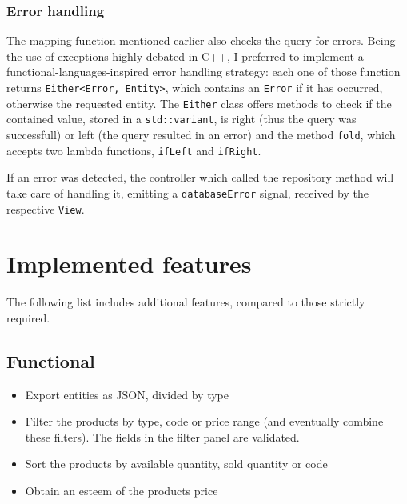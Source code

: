 \documentclass[10pt]{article}
\begin{document}
\subsubsection{Error handling}
The mapping function mentioned earlier also checks the query for errors. Being
the use of exceptions highly debated in C++, I preferred to implement a
functional-languages-inspired error handling strategy: each one of those
function returns \texttt{Either<Error, Entity>}, which contains an
\texttt{Error} if it has occurred, otherwise the requested entity. The
\texttt{Either} class offers methods to check if the contained value, stored in
a \texttt{std::variant}, is right (thus the query was successfull) or left (the
query resulted in an error) and the method \texttt{fold}, which accepts two
lambda functions, \texttt{ifLeft} and \texttt{ifRight}.

If an error was detected, the controller which called the repository method
will take care of handling it, emitting a \texttt{databaseError} signal,
received by the respective \texttt{View}.

\section{Implemented features}
The following list includes additional features, compared to those strictly
required.
\subsection{Functional}
\begin{itemize}
    \item Export entities as JSON, divided by type
    \item Filter the products by type, code or price range (and eventually combine these
          filters). The fields in the filter panel are validated.
    \item Sort the products by available quantity, sold quantity or code
    \item Obtain an esteem of the products price
\end{itemize}
\end{document}
